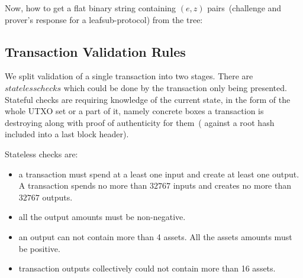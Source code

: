 \documentclass[]{article}   %
\newcommand{\authnote}[2]{\marginpar{\parbox{\marginparwidth}{\tiny %
  \textsf{#1 {\textcolor{blue}{notes: #2}}}}}%
  \textcolor{blue}{\textbf{\dag}}}
\newcommand{\authnote}[2]{
  \textsf{#1 \textcolor{blue}{: #2}}}
\newcommand{\authnote}[2]{}
\newcommand{\knote}[1]{{\authnote{\textcolor{green}{Alex notes}}{#1}}}
\newcommand{\dnote}[1]{{\authnote{\textcolor{red}{Dima notes}}{#1}}}
\newcommand{\coin}{box}
\newcommand{\extract}[1]{$extract({#1})$}
\begin{document}
Now, how to get a flat binary string containing $(e, z)$ pairs~(challenge and prover's response for a leafsub-protocol)
from the tree:

\subsection{Transaction Validation Rules}
\label{tx-validation}

\dnote{describe precisely during https://github.com/ergoplatform/ergo/issues/581}


%
%

We split validation of a single transaction into two stages. There are $stateless checks$ which could be done by the
transaction only being presented. Stateful checks are requiring knowledge of the current state, in the form of the whole
UTXO set or a part of it, namely concrete boxes a transaction is destroying along with proof of authenticity for them~(
against a root hash included into a last block header).

Stateless checks are:

\begin{itemize}
    \item{} a transaction must spend at a least one input and create at least one output. A transaction spends no more
    than $32767$ inputs and creates no more than $32767$ outputs.
    \item{} all the output amounts must be non-negative.
    \item{} an output can not contain more than 4 assets. All the assets amounts must be positive.
    \item{} transaction outputs collectively could not contain more than 16 assets.
\end{itemize}

\knote{Should we allow 0-value iutputs?}

\knote{Check box and transaction sizes.}
\end{document}
